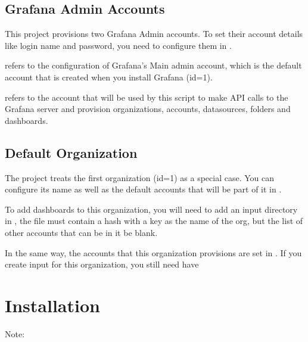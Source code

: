\documentclass[letterpaper,10pt,english]{sphinxmanual}
\begin{document}
\subsection{Grafana Admin Accounts}
\label{\detokenize{readme:grafana-admin-accounts}}
This project provisions two Grafana Admin accounts. To set their account
details like login name and password, you need to configure them in
.

 refers to the configuration of Grafana’s Main admin account,
which is the default account that is created when you install Grafana (id=1).

 refers to the account that will be used by this script to make API
calls to the Grafana server and provision organizations, accounts, datasources,
folders and dashboards.


\subsection{Default Organization}
\label{\detokenize{readme:default-organization}}
The project treats the first organization (id=1) as a special case. You can
configure its name as well as the default accounts that will be part of it in
.

To add dashboards to this organization, you will need to add an input directory
in  {\hyperref[\detokenize{inputStructure:input-structure}]{}},
the  file must contain a hash with a key as the name of the org, but
the list of other accounts that can be in it  be blank.

In the same way, the accounts that this organization provisions are set in
. If you create input for this organization, you
still need have


\section{Installation}
\label{\detokenize{readme:installation}}
Note:   
       
\end{document}

